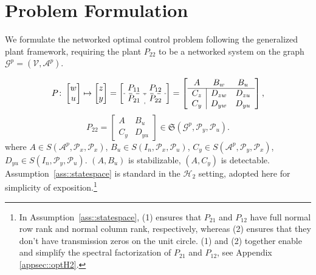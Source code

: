 \section{Problem Formulation}\label{sec:ProbForm}
We formulate the networked optimal control problem following the generalized plant framework, requiring the plant \(P_{22}\) to be a networked system on the graph $\mathcal{G}^p=(\mathcal{V},\mathcal{A}^p)$.
\begin{opt}\label{Prob::DistributedH2}
\begin{equation}\label{eqn::genplt_ss}
    P\colon 
    \begin{bmatrix} 
        w \\ u 
    \end{bmatrix}
    \mapsto
    \begin{bmatrix} 
        z \\ y 
    \end{bmatrix} = \left[
    \begin{array}{c:c}
    P_{11} & P_{12}\\
    \hdashline
    P_{21} & P_{22}
    \end{array}\right] =\left[
\begin{array}{c|cc}
    A & B_w & B_u \\
    \hline
    C_z & D_{zw} & D_{zu}\\
    C_y & D_{yw} & D_{yu}
\end{array}\right],
\end{equation}
\[
P_{22} = \left[
    \begin{array}{c|c}
    A & B_u\\
    \hline
    C_y & D_{yu}
    \end{array}\right]
    \in \mathfrak{S}(\mathcal{G}^p, \mathcal{P}_y, \mathcal{P}_u).
\]
where \(A\in S(\mathcal{A}^p,\mathcal{P}_x,\mathcal{P}_x)\), \(B_u\in S(I_n,\mathcal{P}_x,\mathcal{P}_u)\), \(C_y\in S(\mathcal{A}^p,\mathcal{P}_y,\mathcal{P}_x)\), \(D_{yu}\in S(I_n,\mathcal{P}_y,\mathcal{P}_u)\). \((A,B_u)\) is stabilizable, \((A,C_y)\) is detectable. Assumption~\ref{ass::statespace} is standard in the $\mathcal{H}_2$ setting, adopted here for simplicity of exposition.\footnote{In Assumption~\ref{ass::statespace}, (1) ensures that \(P_{21}\) and \(P_{12}\) have full normal row rank and normal column rank, respectively, whereas (2) ensures that they don't have transmission zeros on the unit circle. (1) and (2) together enable and simplify the spectral factorization of \(P_{21}\) and \(P_{12}\), see Appendix \ref{appsec::optH2}.}

\end{opt}
